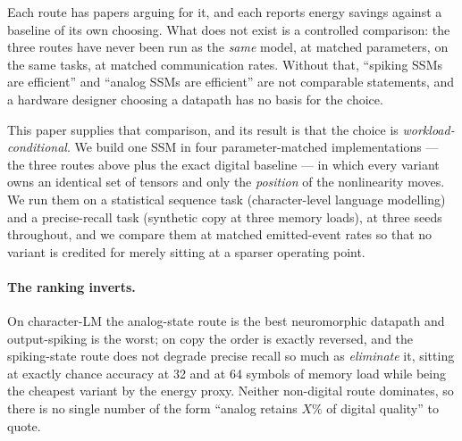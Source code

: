 Each route has papers arguing for it, and each reports energy savings against a baseline of its
own choosing. What does not exist is a controlled comparison: the three routes have never been
run as the \emph{same} model, at matched parameters, on the same tasks, at matched communication
rates. Without that, ``spiking SSMs are efficient'' and ``analog SSMs are efficient'' are not
comparable statements, and a hardware designer choosing a datapath has no basis for the choice.

This paper supplies that comparison, and its result is that the choice is
\emph{workload-conditional}. We build one SSM in four parameter-matched implementations --- the
three routes above plus the exact digital baseline --- in which every variant owns an identical
set of tensors and only the \emph{position} of the nonlinearity moves. We run them on a
statistical sequence task (character-level language modelling) and a precise-recall task
(synthetic copy at three memory loads), at three seeds throughout, and we compare them at matched
emitted-event rates so that no variant is credited for merely sitting at a sparser operating
point.

\paragraph{The ranking inverts.} On character-LM the analog-state route is the best neuromorphic
datapath and output-spiking is the worst; on copy the order is exactly reversed, and the
spiking-state route does not degrade precise recall so much as \emph{eliminate} it, sitting at
exactly chance accuracy at 32 and at 64 symbols of memory load while being the cheapest variant
by the energy proxy. Neither non-digital route dominates, so there is no single number of the form
``analog retains $X\%$ of digital quality'' to quote.


